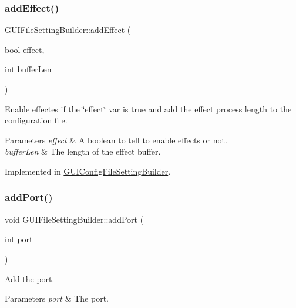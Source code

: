 \subsubsection{\texorpdfstring{add\+Effect()}{addEffect()}}
{\footnotesize\ttfamily G\+U\+I\+File\+Setting\+Builder\+::add\+Effect (\begin{DoxyParamCaption}\item[{bool}]{effect,  }\item[{int}]{buffer\+Len }\end{DoxyParamCaption})\hspace{0.3cm}{\ttfamily [pure virtual]}}



Enable effectes if the \char`\"{}effect\char`\"{} var is true and add the effect process length to the configuration file. 


\begin{DoxyParams}{Parameters}
{\em effect} & A boolean to tell to enable effects or not. \\
\hline
{\em buffer\+Len} & The length of the effect buffer. \\
\hline
\end{DoxyParams}


Implemented in \mbox{\hyperlink{class_g_u_i_config_file_setting_builder_ac7f7238c200dc4000951b24ead586847}{G\+U\+I\+Config\+File\+Setting\+Builder}}.

\mbox{\label{class_g_u_i_file_setting_builder_a7af95f9102bb6b78f6f0b8827b19b286}} 
\subsubsection{\texorpdfstring{add\+Port()}{addPort()}}
{\footnotesize\ttfamily void G\+U\+I\+File\+Setting\+Builder\+::add\+Port (\begin{DoxyParamCaption}\item[{int}]{port }\end{DoxyParamCaption})\hspace{0.3cm}{\ttfamily [pure virtual]}}



Add the port. 


\begin{DoxyParams}{Parameters}
{\em port} & The port. \\
\hline
\end{DoxyParams}


